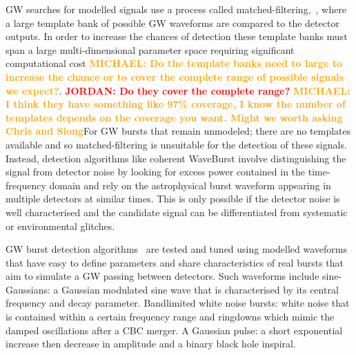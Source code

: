 \documentclass[12pt]{iopart}
\newcommand{\jordan}[1]{\textbf{\textcolor{red}{JORDAN: #1}}}
\newcommand{\chris}[1]{\textbf{\textcolor{green}{CHRIS: #1}}}
\newcommand{\michael}[1]{\textbf{\textcolor{orange}{MICHAEL: #1}}}
\begin{document}
%
\ac{GW} searches for modelled signals use a process called
matched-filtering,~\cite{Owen1998,Usman_2016,sachdev2019gstlal}, where a large template bank of possible
\ac{GW} waveforms are compared to the detector outputs. In order to increase
the chances of detection these template banks must span a large
multi-dimensional parameter space requiring
significant computational cost \michael{Do the template banks need to large to increase the chance or to cover the complete range of possible signals we expect?}. \jordan{Do they cover the complete range?} \michael{I think they have something like 97\% coverage, I know the number of templates depends on the coverage you want. Might we worth asking Chris and Siong}For \ac{GW} bursts that remain unmodeled; there are no
templates available and so matched-filtering is unsuitable for the detection of
these signals.  Instead, detection algorithms like coherent WaveBurst \cite{drago2020coherent} involve distinguishing the signal from
detector noise by looking for excess power contained in the time-frequency
domain and rely on the
astrophysical burst waveform appearing in multiple detectors at similar times.
This is only possible if the detector noise is well characterised and the
candidate signal can be differentiated from systematic or environmental
glitches. 

%
\ac{GW} burst detection algorithms~\cite{Klimenko_2008, Aso_2008} are tested
and tuned using modelled waveforms that have easy to define parameters and share characteristics of real bursts that aim to simulate a \ac{GW} passing between
detectors. Such waveforms include sine-Gaussians: a
Gaussian modulated sine wave that is characterised by its central frequency and
decay parameter. Bandlimited white noise bursts: white noise that is contained
within a certain frequency range and ringdowns which mimic the damped
oscillations after a \ac{CBC} merger. A Gaussian pulse: a short exponential increase then decrease in amplitude and a binary black hole inspiral.
%

\end{document}
